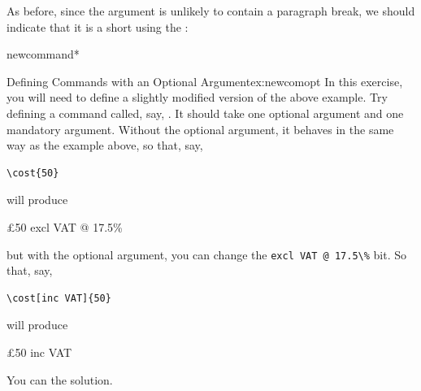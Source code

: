 As before, since the argument is unlikely to contain a paragraph
break, we should indicate that it is a \gls{short} using the :
\begin{codeS}
\gls{newcommand}*
\end{codeS}%

\begin{exercise}{Defining Commands with an Optional Argument}{ex:newcomopt}
In this exercise, you will need to define a slightly modified
version of the above example.  Try defining a command called,
say, .  It should take one optional argument and
one mandatory argument.  Without the optional argument, it
behaves in the same way as the  example above,
so that, say,
\begin{codeS}
\begin{verbatim}
\cost{50}
\end{verbatim}
\end{codeS}%
will produce
\begin{resultS}
\pounds50 excl VAT @ 17.5\%\null
\end{resultS}%
but with the optional argument, you can change the
\verb|excl VAT @ 17.5\%| bit.  So that, say,
\begin{codeS}
\begin{verbatim}
\cost[inc VAT]{50}
\end{verbatim}
\end{codeS}%
will produce
\begin{resultS}
\pounds50 inc VAT\mbox{}%
\end{resultS}

You can  the solution.


\end{exercise}
